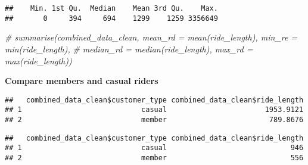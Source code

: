 \documentclass[
]{article}
\newenvironment{Shaded}{\begin{snugshade}}{\end{snugshade}}
\newcommand{\AttributeTok}[1]{\textcolor[rgb]{0.77,0.63,0.00}{#1}}
\newcommand{\CommentTok}[1]{\textcolor[rgb]{0.56,0.35,0.01}{\textit{#1}}}
\newcommand{\FunctionTok}[1]{\textcolor[rgb]{0.00,0.00,0.00}{#1}}
\newcommand{\NormalTok}[1]{#1}
\newcommand{\SpecialCharTok}[1]{\textcolor[rgb]{0.00,0.00,0.00}{#1}}
\begin{document}
\begin{verbatim}
##    Min. 1st Qu.  Median    Mean 3rd Qu.    Max. 
##       0     394     694    1299    1259 3356649
\end{verbatim}

\begin{Shaded}
\begin{Highlighting}[]
\CommentTok{\# summarise(combined\_data\_clean, mean\_rd = mean(ride\_length), min\_re = min(ride\_length),}
          \CommentTok{\# median\_rd = median(ride\_length), max\_rd = max(ride\_length))}
\end{Highlighting}
\end{Shaded}

\textbf{Compare members and casual riders}

\begin{Shaded}
\end{Shaded}

\begin{verbatim}
##   combined_data_clean$customer_type combined_data_clean$ride_length
## 1                            casual                       1953.9121
## 2                            member                        789.8676
\end{verbatim}

\begin{Shaded}
\end{Shaded}

\begin{verbatim}
##   combined_data_clean$customer_type combined_data_clean$ride_length
## 1                            casual                             946
## 2                            member                             556
\end{verbatim}

\begin{Shaded}
\end{Shaded}
\end{document}
